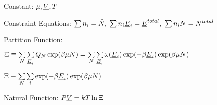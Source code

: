 \begin{bigmdframed}

    
\begin{listone}
    
    \item Constant: $\chempot, \uline{\vol}, \Temp$

    \item Constraint Equations: $\sum\nolimits n_{i} = \tilde{\nummoles}, ~\sum\nolimits n_{i}\uline{\energy}_{i} = \uline{\energy}^{total},~\sum\nolimits n_{i}\nummoles = \nummoles^{total}  $     %
    
    \item Partition Function:
    
    \begin{listtwo}
        
    	\item $\gcpf \equiv \sum\limits_{\nummoles}\sum\limits_{\uline{\energy}_{i}} \cpf\exp(\boltznorm\chempot\nummoles) = \sum\limits_{\nummoles}\sum\limits_{\uline{\energy}_{i}} \mpf(\uline{\energy}_{i})\exp(-\boltznorm\uline{\energy}_{i})\exp(\boltznorm\chempot\nummoles) $
    
    	\item $\gcpf \equiv \sum\limits_{\nummoles}\sum\limits_{i} \exp(-\boltznorm\uline{\energy}_{i})\exp(\boltznorm\chempot\nummoles) $
    
    \end{listtwo}
    
    \medskip       
    
    \item Natural Function: $\p\uline{\vol} = \thermcond\Temp\ln\gcpf$
    
\end{listone}
    
\end{bigmdframed}